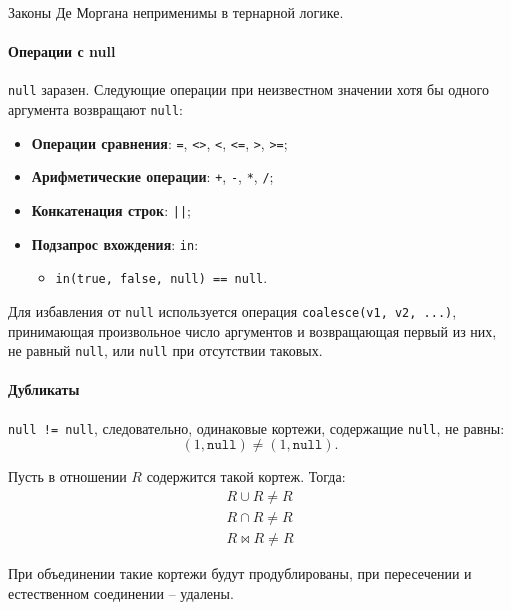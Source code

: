 \begin{proposition}
	Законы Де Моргана неприменимы в тернарной логике.
\end{proposition}

\paragraph{Операции с null}

\texttt{null} заразен. Следующие операции при неизвестном значении хотя бы одного
аргумента
возвращают \texttt{null}:

\begin{itemize}
	\item \textbf{Операции сравнения}: \texttt{=}, \texttt{<>}, \texttt{<},
	      \texttt{<=}, \texttt{>}, \texttt{>=};
	\item \textbf{Арифметические операции}: \texttt{+}, \texttt{-}, \texttt{*},
	      \texttt{/};
	\item \textbf{Конкатенация строк}: \texttt{||};
	\item \textbf{Подзапрос вхождения}: \texttt{in}:
	      \begin{itemize}
		      \item \texttt{in(true, false, null) == null}.
	      \end{itemize}
\end{itemize}

Для избавления от \texttt{null} используется операция \texttt{coalesce(v1, v2, ...)},
принимающая произвольное число аргументов и возвращающая первый из них, не равный
\texttt{null}, или \texttt{null} при отсутствии таковых.

\paragraph{Дубликаты}

\texttt{null != null}, следовательно, одинаковые кортежи, содержащие \texttt{null}, не
равны:
\[
	(1, \texttt{null}) \neq (1, \texttt{null}).
\]

Пусть в отношении $R$ содержится такой кортеж. Тогда:
\begin{align}
	R \cup R \neq R \\
	R \cap R \neq R \\
	R \bowtie R \neq R
\end{align}

При объединении такие кортежи будут продублированы, при пересечении и естественном соединении --
удалены.

